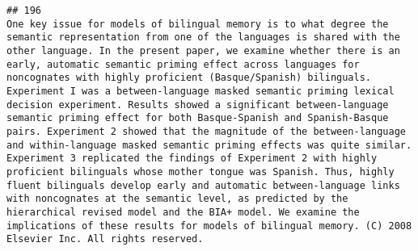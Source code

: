 \documentclass[
  english,
  man]{apa6}
\begin{document}
\begin{verbatim}
## 196                                                                                                                                                                                                                                                                                                                                                                                                                                                                                                                                                                                                                                                                                                                                                                                                                                                                                                                                                                                                                                                                                                                                                                                                                                                                                                                                                                                                                                                                                                                          One key issue for models of bilingual memory is to what degree the semantic representation from one of the languages is shared with the other language. In the present paper, we examine whether there is an early, automatic semantic priming effect across languages for noncognates with highly proficient (Basque/Spanish) bilinguals. Experiment I was a between-language masked semantic priming lexical decision experiment. Results showed a significant between-language semantic priming effect for both Basque-Spanish and Spanish-Basque pairs. Experiment 2 showed that the magnitude of the between-language and within-language masked semantic priming effects was quite similar. Experiment 3 replicated the findings of Experiment 2 with highly proficient bilinguals whose mother tongue was Spanish. Thus, highly fluent bilinguals develop early and automatic between-language links with noncognates at the semantic level, as predicted by the hierarchical revised model and the BIA+ model. We examine the implications of these results for models of bilingual memory. (C) 2008 Elsevier Inc. All rights reserved.

\end{verbatim}
\end{document}
